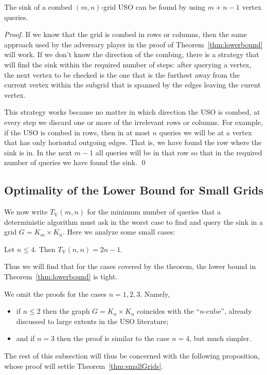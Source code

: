 \documentclass[runningheads,a4paper]{llncs}
\newcommand{\timeVertex}{\ensuremath{T_\mathrm{V}}}
\begin{document}
\begin{theorem}
 The sink of a combed $(m,n)$-grid USO can be found by using $m+n-1$ vertex queries.
\end{theorem}

\begin{proof}
 If we know that the grid is combed in rows or columns, then the same approach used by the adversary player in the proof of Theorem~\ref{thm:lowerbound} will work.
 If we don't know the direction of the combing, there is a strategy that will find the sink within the required number of steps: after querying a vertex, the next vertex to be checked is the one that is the furthest away from the current vertex within the subgrid that is spanned by the edges leaving the curent vertex. 
 
 This strategy works because no matter in which direction the USO is combed, at every step we discard  one or more of the irrelevant rows or columns. For example, if the USO is combed in rows, then in at most $n$ queries we will be at a vertex that has only horiontal outgoing edges. That is, we have found the row where the sink is in. In the next $m-1$ all queries will be in that row so that in the required number of queries we have found the sink. \qed
\end{proof}


\subsection{Optimality of the Lower Bound for Small Grids}

We now write $\timeVertex(m,n)$ for the minimum number of queries that a
deterministic algorithm must ask in the worst case to find and query the sink
in a grid $G = K_m \times K_n$.
Here we analyze some small cases:
\begin{theorem}
    \label{thm:smallGrids}
    Let $n \le 4$. Then $\timeVertex(n,n) = 2n-1$.
\end{theorem}
Thus we will find that for the cases covered by the theorem, the lower bound
in Theorem~\ref{thm:lowerbound} is tight.

We omit the proofs for the cases $n = 1,2,3$. Namely,
\begin{itemize}
    \item
        if $n \le 2$ then the graph $G = K_n \times K_n$ coincides with the
        ``$n$-cube'', already discussed to large extents in the USO
        literature;
    \item
        and if $n = 3$ then the proof is similar to the case $n=4$, but much
        simpler.
\end{itemize}
The rest of this subsection will thus be concerned with the following
proposition, whose proof will settle Theorem~\ref{thm:smallGrids}.
\end{document}
